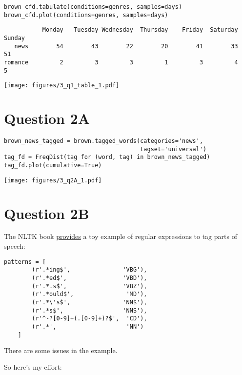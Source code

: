 \documentclass[man,12pt]{apa6}
\begin{document}
\begin{verbatim}
brown_cfd.tabulate(conditions=genres, samples=days)
brown_cfd.plot(conditions=genres, samples=days)
\end{verbatim}
\begin{verbatim}
           Monday   Tuesday Wednesday  Thursday    Friday  Saturday
Sunday
   news        54        43        22        20        41        33
51
romance         2         3         3         1         3         4
5

\end{verbatim}
\texttt{[image: figures/3\_q1\_table\_1.pdf]}


\section{Question 2A}


\begin{verbatim}
brown_news_tagged = brown.tagged_words(categories='news',
                                       tagset='universal')
tag_fd = FreqDist(tag for (word, tag) in brown_news_tagged)
tag_fd.plot(cumulative=True)
\end{verbatim}
\texttt{[image: figures/3\_q2A\_1.pdf]}


\section{Question 2B}

The NLTK book \href{http://www.nltk.org/book/ch05.html}{provides} a toy example of
regular expressions to tag parts of speech:

\begin{verbatim}
patterns = [
        (r'.*ing$',               'VBG'),
        (r'.*ed$',                'VBD'),
        (r'.*.s$',                'VBZ'),
        (r'.*ould$',               'MD'),
        (r'.*\'s$',               'NN$'),
        (r'.*s$',                 'NNS'),
        (r'^-?[0-9]+(.[0-9]+)?$',  'CD'),
        (r'.*',                    'NN')
    ]
\end{verbatim}


There are some issues in the example.

So here's my effort:
\end{document}
